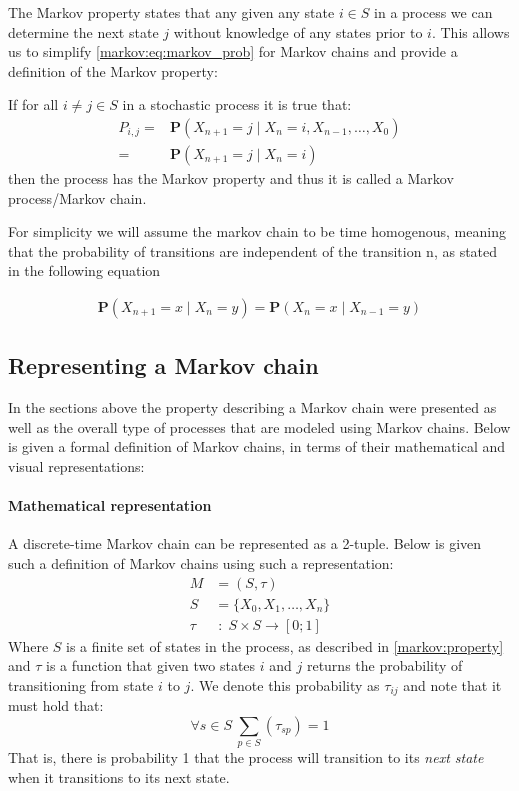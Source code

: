 The Markov property states that any given any state $i \in S$ in a process we can determine the next state $j$ without knowledge of any states prior to $i$.
This allows us to simplify \cref{markov:eq:markov_prob} for Markov chains and provide a definition of the Markov property:

If for all $i \neq j \in S$ in a stochastic process it is true that:
\begin{align}\label{markov:eq:markov_prob}
P_{i,j} = &\mathbf{P}(X_{n+1} = j \mid X_n = i, X_{n-1}, \dots, X_0) \nonumber\\
        = &\mathbf{P}(X_{n+1} = j \mid X_n = i)
\end{align}
then the process has the Markov property and thus it is called a Markov process/Markov chain.

For simplicity we will assume the markov chain to be time homogenous, meaning that the probability of transitions are independent of the transition n, as stated in the following equation


\begin{align}
\mathbf{P}(X_{n+1} = x \mid X_n = y) = \mathbf{P}(X_{n} = x \mid X_{n-1} = y)
\end{align}

\subsection{Representing a Markov chain}
In the sections above the property describing a Markov chain were presented as well as the overall type of processes that are modeled using Markov chains.
Below is given a formal definition of Markov chains, in terms of their mathematical and visual representations:

\paragraph{Mathematical representation}
A discrete-time Markov chain can be represented as a 2-tuple.
Below is given such a definition of Markov chains using such a representation:
\begin{align}
M & = (S, \tau)\\
S & = \{X_0, X_1, \dots, X_n\} \nonumber\\
\tau & \; : \; S \times S \rightarrow [0; 1] \nonumber
\end{align}
Where $S$ is a finite set of states in the process, as described in \cref{markov:property} and $\tau$ is a function that given two states $i$ and $j$ returns the probability of transitioning from state $i$ to $j$.
We denote this probability as $\tau_{ij}$ and note that it must hold that:
\begin{equation}\label{markov:eq:state_sum}
\forall s \in S \: \sum_{p \in S} (\tau_{sp}) = 1
\end{equation}
That is, there is probability 1 that the process will transition to its \emph{next state} when it transitions to its next state.

